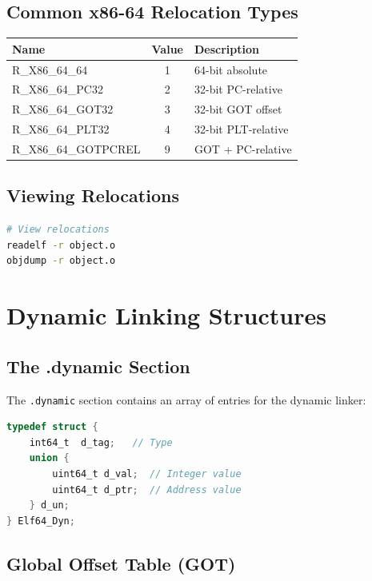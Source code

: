 \subsection{Common x86-64 Relocation Types}

\begin{tabular}{|l|c|l|}
\hline
\textbf{Name} & \textbf{Value} & \textbf{Description} \\
\hline
R\_X86\_64\_64 & 1 & 64-bit absolute \\
\hline
R\_X86\_64\_PC32 & 2 & 32-bit PC-relative \\
\hline
R\_X86\_64\_GOT32 & 3 & 32-bit GOT offset \\
\hline
R\_X86\_64\_PLT32 & 4 & 32-bit PLT-relative \\
\hline
R\_X86\_64\_GOTPCREL & 9 & GOT + PC-relative \\
\hline
\end{tabular}

\subsection{Viewing Relocations}

\begin{lstlisting}[language=bash]
# View relocations
readelf -r object.o
objdump -r object.o
\end{lstlisting}

\section{Dynamic Linking Structures}

\subsection{The .dynamic Section}

The \texttt{.dynamic} section contains an array of entries for the dynamic linker:

\begin{lstlisting}[language=C]
typedef struct {
    int64_t  d_tag;   // Type
    union {
        uint64_t d_val;  // Integer value
        uint64_t d_ptr;  // Address value
    } d_un;
} Elf64_Dyn;
\end{lstlisting}

\subsection{Global Offset Table (GOT)}

